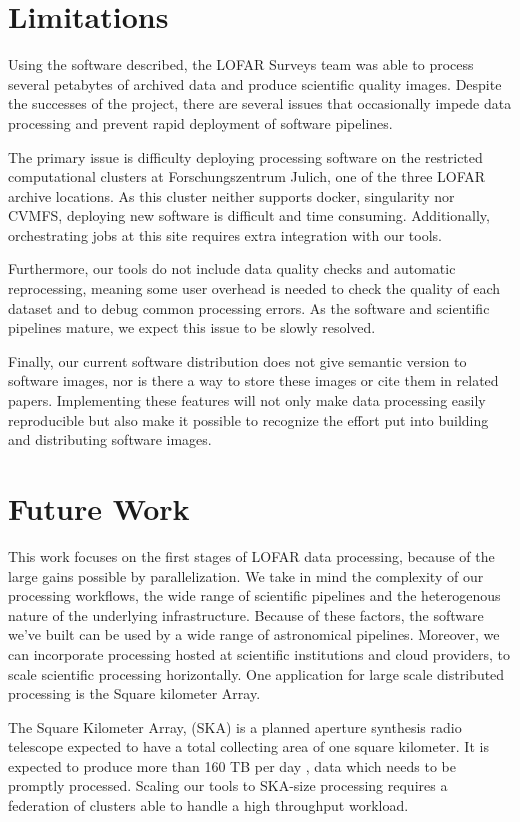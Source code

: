 \section{Limitations}

Using the software described, the LOFAR Surveys team was able to process several petabytes of archived data and produce scientific quality images. Despite the successes of the project, there are several issues that occasionally impede data processing and prevent rapid deployment of software pipelines.

The primary issue is difficulty deploying processing software on the restricted computational clusters at Forschungszentrum J{\:u}lich, one of the three LOFAR archive locations. As this cluster neither supports docker, singularity nor CVMFS, deploying new software is difficult and time consuming. Additionally, orchestrating jobs at this site requires extra integration with our tools.

Furthermore, our tools do not include data quality checks and automatic reprocessing, meaning some user overhead is needed to check the quality of each dataset and to debug common processing errors. As the software and scientific pipelines mature, we expect this issue to be slowly resolved.

Finally, our current software distribution does not give semantic version to software images, nor is there a way to store these images or cite them in related papers. Implementing these features will not only make data processing easily reproducible but also make it possible to recognize the effort put into building and distributing software images.


\section{Future Work}

This work focuses on the first stages of LOFAR data processing, because of the large gains possible by parallelization. We take in mind the complexity of our processing workflows, the wide range of scientific pipelines and the heterogenous nature of the underlying infrastructure. Because of these factors, the software we've built can be used by a wide range of astronomical pipelines. Moreover, we can incorporate processing hosted at scientific institutions and cloud providers, to scale scientific processing horizontally.  One application for large scale distributed processing is the Square kilometer Array. 

The Square Kilometer Array, (SKA) is a planned aperture synthesis radio telescope expected to have a total collecting area of one square kilometer. It is expected to produce more than 160 TB per day \citep{johnston2017taming}, data which needs to be promptly processed. Scaling our tools to SKA-size processing requires a federation of clusters able to handle a high throughput workload.   
